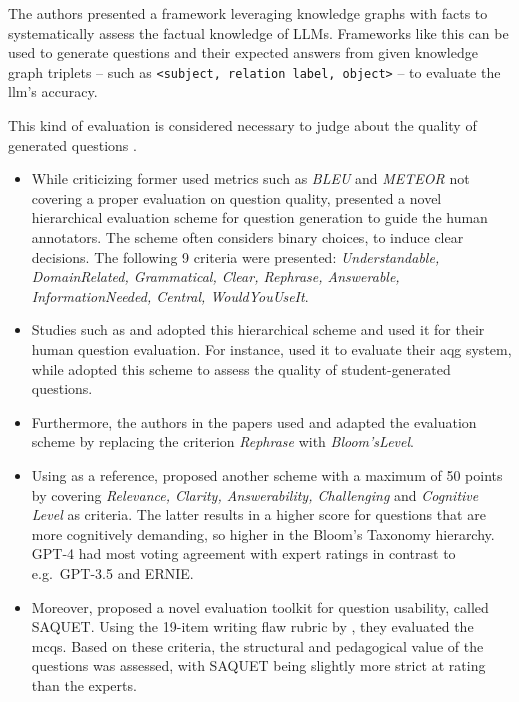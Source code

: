 
 The authors \cite{luo_systematic_2023} presented a framework leveraging knowledge graphs with facts to systematically assess the factual knowledge of LLMs. Frameworks like this can be used to generate questions and their expected answers from given knowledge graph triplets -- such as \texttt{<subject, relation label, object>} -- to evaluate the \ac{llm}'s accuracy.


 This kind of evaluation is considered necessary to judge about the quality of generated questions \cite{horbach_linguistic_2020}.

\begin{itemize}
   \item While criticizing former used metrics such as \textit{BLEU} and \textit{METEOR} not covering a proper evaluation on question quality, \cite{horbach_linguistic_2020} presented a novel hierarchical evaluation scheme for question generation to guide the human annotators. The scheme often considers binary choices, to induce clear decisions. The following 9 criteria were presented: \textit{Understandable, DomainRelated, Grammatical, Clear, Rephrase, Answerable, InformationNeeded, Central, WouldYouUseIt}. 
   \item Studies such as \cite{steuer_i_2021} and \cite{moore_assessing_2022} adopted this hierarchical scheme and used it for their human question evaluation. For instance, \cite{steuer_i_2021} used it to evaluate their \ac{aqg} system, while \cite{moore_assessing_2022} adopted this scheme to assess the quality of student-generated questions.
   \item Furthermore, the authors in the papers \cite{scaria_how_2024,scaria_automated_2024} used and adapted the evaluation scheme by replacing the criterion \textit{Rephrase} with \textit{Bloom'sLevel}.
   \item  Using \cite{moore_assessing_2022} as a reference, \cite{mi_comparative_2024} proposed another scheme with a maximum of 50 points by covering \textit{Relevance, Clarity, Answerability, Challenging} and \textit{Cognitive Level} as criteria. The latter results in a higher score for questions that are more cognitively demanding, so higher in the Bloom's Taxonomy hierarchy. GPT-4 had most voting agreement with expert ratings in contrast to e.g.\ GPT-3.5 and ERNIE.
   \item Moreover, \cite{moore_automatic_2024} proposed a novel evaluation toolkit for question usability, called SAQUET. Using the 19-item writing flaw rubric by \cite{tarrant_frequency_2006}, they evaluated the \ac{mcqs}. Based on these criteria, the structural and pedagogical value of the questions was assessed, with SAQUET being slightly more strict at rating than the experts.
\end{itemize}

